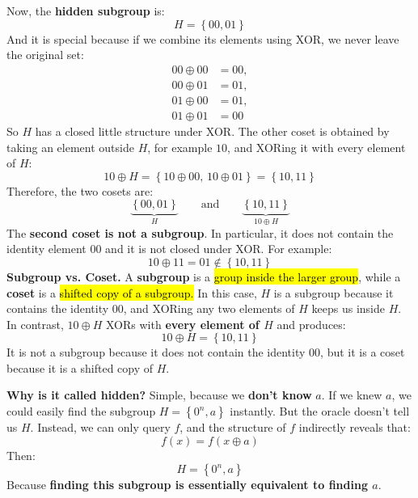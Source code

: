 \begin{examplebox}
    \highspace
    Now, the \textbf{hidden subgroup} is:
    \begin{equation*}
        H = \left\{00, 01\right\}
    \end{equation*}
    And it is special because if we combine its elements using XOR, we never leave the original set:
    \begin{align*}
        00 \oplus 00 &= 00,\\
        00 \oplus 01 &= 01,\\
        01 \oplus 00 &= 01,\\
        01 \oplus 01 &= 00
    \end{align*}
    So $H$ has a closed little structure under XOR. The other coset is obtained by taking an element outside $H$, for example $10$, and XORing it with every element of $H$:
    \begin{equation*}
        10 \oplus H
        =
        \left\{
            10 \oplus 00,\,
            10 \oplus 01
        \right\}
        =
        \left\{10,11\right\}
    \end{equation*}
    Therefore, the two cosets are:
    \begin{equation*}
        \underbrace{\left\{00,01\right\}}_{H}
        \qquad\text{and}\qquad
        \underbrace{\left\{10,11\right\}}_{10\oplus H}
    \end{equation*}
    The \textbf{second coset is not a subgroup}. In particular, it does not contain the identity element $00$ and it is not closed under XOR. For example:
    \begin{equation*}
        10 \oplus 11 = 01
        \notin \left\{10,11\right\}
    \end{equation*}
    \textcolor{Green3}{ \textbf{Subgroup vs. Coset.}} A \textbf{subgroup} is a \hl{group inside the larger group}, while a \textbf{coset} is a \hl{shifted copy of a subgroup.} In this case, $H$ is a subgroup because it contains the identity $00$, and XORing any two elements of $H$ keeps us inside $H$. In contrast, $10 \oplus H$ XORs with \textbf{every element of $H$} and produces:
    \begin{equation*}
        10 \oplus H = \left\{10,11\right\}
    \end{equation*}
    It is not a subgroup because it does not contain the identity $00$, but it is a coset because it is a shifted copy of $H$.
\end{examplebox}

\highspace
\textcolor{Green3}{ \textbf{Why is it called hidden?}} Simple, because we \textbf{don't know} $a$. If we knew $a$, we could easily find the subgroup $H = \left\{0^n, a\right\}$ instantly. But the oracle doesn't tell us $H$. Instead, we can only query $f$, and the structure of $f$ indirectly reveals that:
\begin{equation*}
    f(x) = f(x \oplus a)
\end{equation*}
Then:
\begin{equation*}
    H = \left\{0^n, a\right\}
\end{equation*}
Because \textbf{finding this subgroup is essentially equivalent to finding $a$}.

